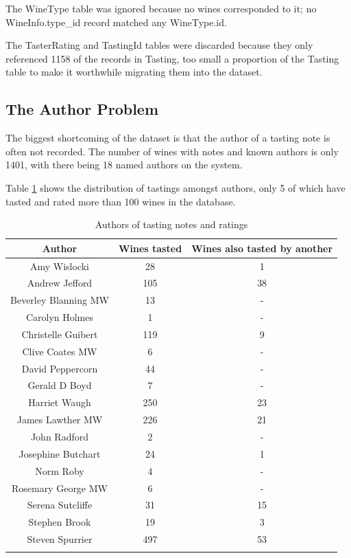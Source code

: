 The WineType table was ignored because no wines corresponded to it; no WineInfo.type\_id record matched any WineType.id.

The TasterRating and TastingId tables were discarded because they only referenced 1158 of the records in Tasting, too small a proportion of the Tasting table to make it worthwhile migrating them into the dataset.

\subsection{The Author Problem}

The biggest shortcoming of the dataset is that the author of a tasting note is often not recorded. The number of wines with notes and known authors is only 1401, with there being 18 named authors on the system. 

Table \ref{table:authors} shows the distribution of tastings amongst authors, only 5 of which have tasted and rated more than 100 wines in the database.

\begin{table}[ht]
    \caption{Authors of tasting notes and ratings}
    \centering
    \begin{tabular}{c c c}
        \\\hline\hline
        Author               & Wines tasted & Wines also tasted by another
        \\\hline
        Amy Wislocki         &           28 & 1  \\
        Andrew Jefford       &          105 & 38 \\
        Beverley Blanning MW &           13 & -  \\
        Carolyn Holmes       &            1 & -  \\
        Christelle Guibert   &          119 & 9  \\
        Clive Coates MW      &            6 & -  \\
        David Peppercorn     &           44 & -  \\
        Gerald D Boyd        &            7 & -  \\
        Harriet Waugh        &          250 & 23 \\
        James Lawther MW     &          226 & 21 \\
        John Radford         &            2 & -  \\
        Josephine Butchart   &           24 & 1  \\
        Norm Roby            &            4 & -  \\
        Rosemary George MW   &            6 & -  \\
        Serena Sutcliffe     &           31 & 15 \\
        Stephen Brook        &           19 & 3  \\
        Steven Spurrier      &          497 & 53 \\
        \\\hline
    \end{tabular}
    \label{table:authors}
\end{table}

